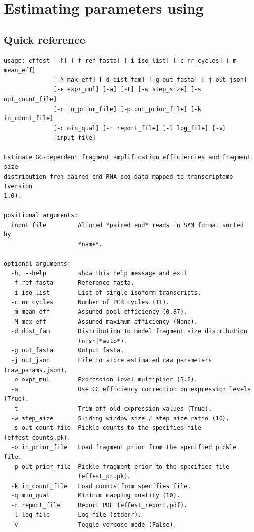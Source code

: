 \section{Estimating parameters using \effest}

\subsection{Quick reference}
\label{ss:qeffest}

\begin{verbatim}
usage: effest [-h] [-f ref_fasta] [-i iso_list] [-c nr_cycles] [-m mean_eff]
              [-M max_eff] [-d dist_fam] [-g out_fasta] [-j out_json]
              [-e expr_mul] [-a] [-t] [-w step_size] [-s out_count_file]
              [-o in_prior_file] [-p out_prior_file] [-k in_count_file]
              [-q min_qual] [-r report_file] [-l log_file] [-v]
              [input file]

Estimate GC-dependent fragment amplification efficiencies and fragment size
distribution from paired-end RNA-seq data mapped to transcriptome (version
1.0).

positional arguments:
  input file         Aligned *paired end* reads in SAM format sorted by
                     *name*.

optional arguments:
  -h, --help         show this help message and exit
  -f ref_fasta       Reference fasta.
  -i iso_list        List of single isoform transcripts.
  -c nr_cycles       Number of PCR cycles (11).
  -m mean_eff        Assumed pool efficiency (0.87).
  -M max_eff         Assumed maximum efficiency (None).
  -d dist_fam        Distribution to model fragment size distribution
                     (n|sn|*auto*).
  -g out_fasta       Output fasta.
  -j out_json        File to store estimated raw parameters (raw_params.json).
  -e expr_mul        Expression level multiplier (5.0).
  -a                 Use GC efficiency correction on expression levels (True).
  -t                 Trim off old expression values (True).
  -w step_size       Sliding window size / step size ratio (10).
  -s out_count_file  Pickle counts to the specified file (effest_counts.pk).
  -o in_prior_file   Load fragment prior from the specified pickle file.
  -p out_prior_file  Pickle fragment prior to the specifies file
                     (effest_pr.pk).
  -k in_count_file   Load counts from specifies file.
  -q min_qual        Minimum mapping quality (10).
  -r report_file     Report PDF (effest_report.pdf).
  -l log_file        Log file (stderr).
  -v                 Toggle verbose mode (False).
\end{verbatim}

